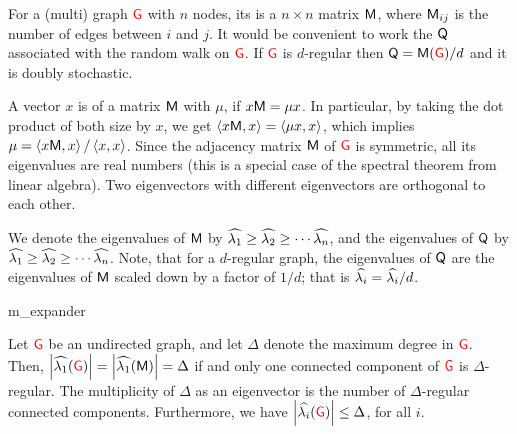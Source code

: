 For a (multi) graph ${\textcolor{red}{\mathsf{G}}}$ with $n$ nodes, its  is a $n\times n$ matrix $\mathsf{M}$, where $\mathsf{M}_{ij}$ is the
number of edges between $i$ and $j$.  It would be convenient to work
the  $\mathsf{Q}$ associated with the random walk
on ${\textcolor{red}{\mathsf{G}}}$. If ${\textcolor{red}{\mathsf{G}}}$ is $d$-regular then $\mathsf{Q} =
\mathsf{M}({\textcolor{red}{\mathsf{G}}})/d$ and it is doubly stochastic.

A vector $x$ is  of a matrix $\mathsf{M}$ with
 $\mu$, if $x \mathsf{M} = \mu x$. In particular,
by taking the dot product of both size by $x$, we get $\left\langle {{x
   \mathsf{M}},{x}} \right\rangle = \left\langle {{\mu x},{x}} \right\rangle $, which implies $\mu =
\left\langle {{x \mathsf{M}},{x}} \right\rangle/ \left\langle {{ x},{x}} \right\rangle$. Since the adjacency matrix
$\mathsf{M}$ of ${\textcolor{red}{\mathsf{G}}}$ is symmetric, all its eigenvalues are real numbers
(this is a special case of the spectral theorem from linear algebra).
Two eigenvectors with different eigenvectors are orthogonal to each
other.

We denote the eigenvalues of $\mathsf{M}$ by $\widehat{\lambda_{1}} \geq \widehat{\lambda_{2}} \geq
\cdots \widehat{\lambda_{n}}$, and the eigenvalues of $\mathsf{Q}$ by $\widehat{\lambda_{1}}\geq
\widehat{\lambda_{2}} \geq \cdots \widehat{\lambda_{n}}$.  Note, that for a $d$-regular graph, the
eigenvalues of $\mathsf{Q}$ are the eigenvalues of $\mathsf{M}$ scaled down by
a factor of $1/d$; that is $\widehat{\lambda_{i}} = \widehat{\lambda_{i}}/d$.

\begin{fragment}{m_expander}
\begin{lemma}
    Let ${\textcolor{red}{\mathsf{G}}}$ be an undirected graph, and let $\Delta$ denote the
    maximum degree in ${\textcolor{red}{\mathsf{G}}}$. Then, $\left| {\widehat{\lambda_{1}}({\textcolor{red}{\mathsf{G}}})} \right| =
    \left| {\widehat{\lambda_{1}}(\mathsf{M})} \right|=\Delta$ if and only one connected component
    of ${\textcolor{red}{\mathsf{G}}}$ is $\Delta$-regular. The multiplicity of $\Delta$ as
    an eigenvector is the number of $\Delta$-regular connected
    components. Furthermore, we have $\left| {\widehat{\lambda_{i}}({\textcolor{red}{\mathsf{G}}})} \right| \leq
    \Delta$, for all $i$.

\end{lemma}
\end{fragment}

